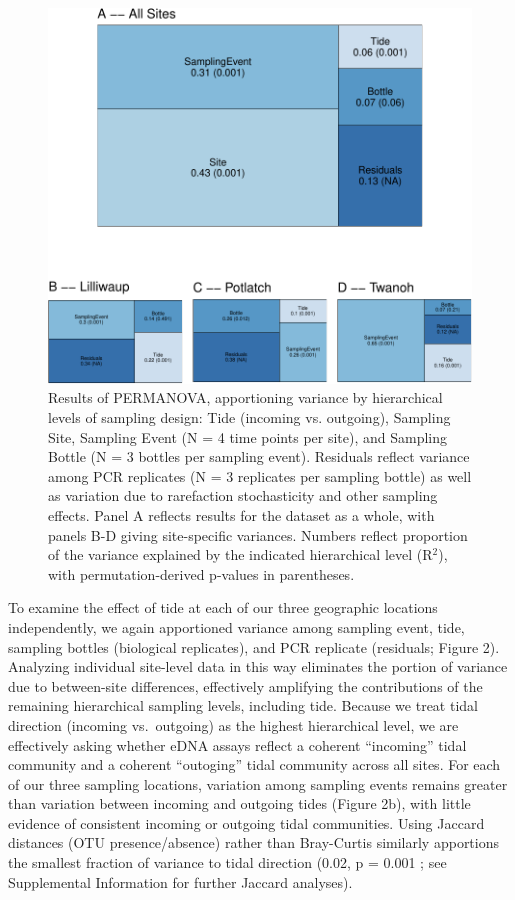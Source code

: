 \documentclass[fleqn,10pt,lineno]{wlpeerj} %
\begin{document}
\begin{figure}[!ht]

{\centering \includegraphics{figures/FIG2_ADONIS_TreemapDiagrams-1} 

}

\caption{\label{fig:AdonisFigure}Results of PERMANOVA, apportioning variance by hierarchical levels of sampling design: Tide (incoming vs. outgoing), Sampling Site, Sampling Event (N = 4 time points per site), and Sampling Bottle (N = 3 bottles per sampling event). Residuals reflect variance among PCR replicates (N = 3 replicates per sampling bottle) as well as variation due to rarefaction stochasticity and other sampling effects. Panel A reflects results for the dataset as a whole, with panels B-D giving site-specific variances. Numbers reflect proportion of the variance explained by the indicated hierarchical level (R$^2$), with permutation-derived p-values in parentheses.}\label{fig:FIG2_ADONIS_TreemapDiagrams}
\end{figure}

To examine the effect of tide at each of our three geographic locations
independently, we again apportioned variance among sampling event, tide,
sampling bottles (biological replicates), and PCR replicate (residuals;
Figure 2). Analyzing individual site-level data in this way eliminates
the portion of variance due to between-site differences, effectively
amplifying the contributions of the remaining hierarchical sampling
levels, including tide. Because we treat tidal direction (incoming
vs.~outgoing) as the highest hierarchical level, we are effectively
asking whether eDNA assays reflect a coherent ``incoming'' tidal
community and a coherent ``outoging'' tidal community across all sites.
For each of our three sampling locations, variation among sampling
events remains greater than variation between incoming and outgoing
tides (Figure 2b), with little evidence of consistent incoming or
outgoing tidal communities. Using Jaccard distances (OTU
presence/absence) rather than Bray-Curtis similarly apportions the
smallest fraction of variance to tidal direction (0.02, p = 0.001 ; see
Supplemental Information for further Jaccard analyses).
\end{document}
